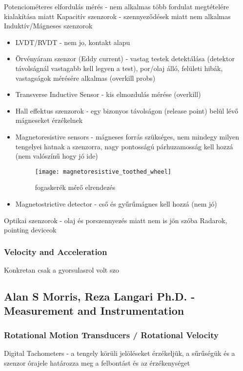 \documentclass{article}
\begin{document}
	Potenciométeres elfordulás mérés - nem alkalmas több fordulat megtételére kialakítása miatt
	Kapacitív szenzorok - szennyeződések miatt nem alkalmas
	Induktív/Mágneses szenzorok
	\begin{itemize}
		\item LVDT/RVDT - nem jo, kontakt alapu
		\item Örvényáram szenzor (Eddy current) - vastag testek detektálása (detektor távolságnál vastagabb kell legyen a test), por/olaj álló, felületi hibák, vastagságok mérésére alkalmas (overkill probs)
		\item Transverse Inductive Sensor - kis elmozdulás mérése (overkill)
		\item Hall effektus szenzorok - egy bizonyos távolságon (release point) belül lévő mágneseket érzékelnek
		\item Magnetoresistive sensors - mágneses forrás szükséges, nem mindegy milyen tengelyei hatnak a szenzorra, nagy pontosságú párhuzamosság kell hozzá (nem valószínű hogy jó ide)
		\begin{figure}[h]
			\caption{fogaskerék mérő elrendezés}
			\centering
			\texttt{[image: magnetoresistive\_toothed\_wheel]}
		\end{figure}
		\item Magnetostrictive detector - cső és gyűrűmágnes kell hozzá (nem jó)
	\end{itemize}
	Optikai szenzorok - olaj és porszennyezés miatt nem is jön szóba
	Radarok, pointing deviceok
	
	
	\subsubsection {Velocity and Acceleration}
	Konkretan csak a gyorsulasrol volt szo
	
	\subsection{Alan S Morris, Reza Langari Ph.D. - Measurement and Instrumentation}
	
	\subsubsection{Rotational Motion Transducers / Rotational Velocity}
	
	Digital Tachometers - a tengely körüli jelöléseket érzékeljük, a sűrűségük és a szenzor órajele határozza meg a felbontást és az érzékenységet
	
\end{document}
